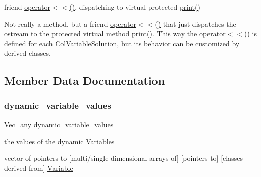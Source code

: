 friend \mbox{\hyperlink{class_s_m_spp__di__unipi__it_1_1_col_variable_solution_a1529e2cc6b571cfe0bd3dd0cfb82b587}{operator$<$$<$()}}, dispatching to virtual protected \mbox{\hyperlink{class_s_m_spp__di__unipi__it_1_1_col_variable_solution_a59a9fcbf8f9f86d348344b2073644b0e}{print()}} 

Not really a method, but a friend \mbox{\hyperlink{class_s_m_spp__di__unipi__it_1_1_col_variable_solution_a1529e2cc6b571cfe0bd3dd0cfb82b587}{operator$<$$<$()}} that just dispatches the ostream to the protected virtual method \mbox{\hyperlink{class_s_m_spp__di__unipi__it_1_1_col_variable_solution_a59a9fcbf8f9f86d348344b2073644b0e}{print()}}. This way the \mbox{\hyperlink{class_s_m_spp__di__unipi__it_1_1_col_variable_solution_a1529e2cc6b571cfe0bd3dd0cfb82b587}{operator$<$$<$()}} is defined for each \mbox{\hyperlink{class_s_m_spp__di__unipi__it_1_1_col_variable_solution}{Col\+Variable\+Solution}}, but its behavior can be customized by derived classes. 

\subsection{Member Data Documentation}
\mbox{\label{class_s_m_spp__di__unipi__it_1_1_col_variable_solution_a02af9934be47ba5b952c09fd1f63d35f}} 
\subsubsection{\texorpdfstring{dynamic\+\_\+variable\+\_\+values}{dynamic\_variable\_values}}
{\footnotesize\ttfamily \mbox{\hyperlink{group___s_m_s__types_ga58ded0963812566c064a5177b2f84c28}{Vec\+\_\+any}} dynamic\+\_\+variable\+\_\+values\hspace{0.3cm}{\ttfamily [protected]}}



the values of the dynamic Variables 

vector of pointers to \mbox{[}multi/single dimensional arrays of\mbox{]} \mbox{[}pointers to\mbox{]} \mbox{[}classes derived from\mbox{]} \mbox{\hyperlink{class_s_m_spp__di__unipi__it_1_1_variable}{Variable}} \mbox{\label{class_s_m_spp__di__unipi__it_1_1_col_variable_solution_a92425828d52bb80f04e3e9b01a43f41a}} 
